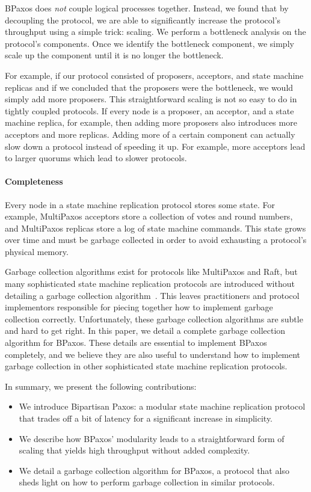 BPaxos does \emph{not} couple logical processes together. Instead, we found
that by decoupling the protocol, we are able to significantly increase the
protocol's throughput using a simple trick: scaling. We perform a bottleneck
analysis on the protocol's components. Once we identify the bottleneck
component, we simply scale up the component until it is no longer the
bottleneck.

For example, if our protocol consisted of proposers, acceptors, and state
machine replicas and if we concluded that the proposers were the bottleneck, we
would simply add more proposers. This straightforward scaling is not so easy to
do in tightly coupled protocols. If every node is a proposer, an acceptor, and
a state machine replica, for example, then adding more proposers also
introduces more acceptors and more replicas. Adding more of a certain component
can actually slow down a protocol instead of speeding it up. For example, more
acceptors lead to larger quorums which lead to slower protocols.

\paragraph{Completeness}
Every node in a state machine replication protocol stores some state. For
example, MultiPaxos acceptors store a collection of votes and round numbers,
and MultiPaxos replicas store a log of state machine commands. This state grows
over time and must be garbage collected in order to avoid exhausting a
protocol's physical memory.

Garbage collection algorithms exist for protocols like MultiPaxos and Raft, but
many sophisticated state machine replication protocols are introduced without
detailing a garbage collection algorithm~\cite{%
  moraru2013there, %
  arun2017speeding, %
  zhang2018building, %
  mu2016consolidating %
}. This leaves practitioners and protocol implementors responsible for piecing
together how to implement garbage collection correctly. Unfortunately, these
garbage collection algorithms are subtle and hard to get right. In this paper,
we detail a complete garbage collection algorithm for BPaxos. These details are
essential to implement BPaxos completely, and we believe they are also useful
to understand how to implement garbage collection in other sophisticated state
machine replication protocols.

In summary, we present the following contributions:
\begin{itemize}
  \item
    We introduce Bipartisan Paxos: a modular state machine replication protocol
    that trades off a bit of latency for a significant increase in simplicity.
  \item
    We describe how BPaxos' modularity leads to a straightforward form of
    scaling that yields high throughput without added complexity.
  \item
    We detail a garbage collection algorithm for BPaxos, a protocol that also
    sheds light on how to perform garbage collection in similar protocols.
\end{itemize}

